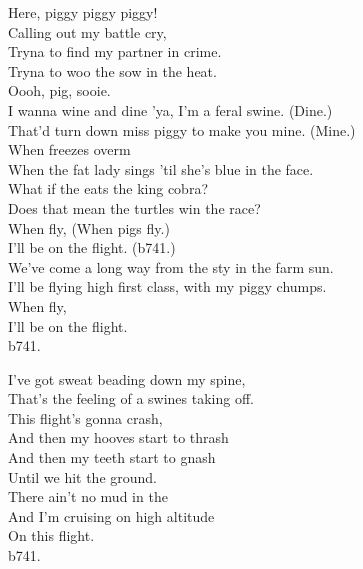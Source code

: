 
Here, piggy piggy piggy! \\

Calling out my battle cry, \\
Tryna to find my partner in crime. \\
Tryna to woo the sow in the heat. \\
Oooh, pig, sooie. \\

I wanna wine and dine 'ya, I'm a feral swine. (Dine.) \\
That'd turn down miss piggy to make you mine. (Mine.) \\

When  freezes overm \\
When the fat lady sings 'til she's blue in the face. \\
What if the  eats the king cobra? \\
Does that mean the turtles win the race? \\

When  fly, (When pigs fly.) \\
I'll be on the flight. (b741.) \\

We've come a long way from the sty in the farm sun. \\
I'll be flying high first class, with my piggy chumps. \\

When  fly, \\
I'll be on the flight. \\
b741. \\


I've got sweat beading down my spine, \\
That's the feeling of a swines taking off. \\
This flight's gonna crash, \\
And then my hooves start to thrash \\
And then my teeth start to gnash \\
Until we hit the ground. \\

There ain't no mud in the  \\
And I'm cruising on high altitude \\
On this flight. \\
b741. \\

